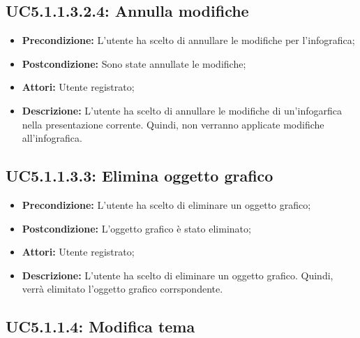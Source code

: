 \subsection{ UC5.1.1.3.2.4: Annulla modifiche}

\begin{itemize}
	\item \textbf{Precondizione:} L'utente ha scelto di annullare le modifiche per l'infografica;
	\item \textbf{Postcondizione:} Sono state annullate le modifiche;
	\item \textbf{Attori:} Utente registrato;
	\item \textbf{Descrizione:} L'utente ha scelto di annullare le modifiche di un'infogarfica nella presentazione corrente. Quindi, non verranno applicate modifiche all'infografica.
\end{itemize}
\subsection{ UC5.1.1.3.3: Elimina oggetto grafico}

\begin{itemize}
	\item \textbf{Precondizione:} L'utente ha scelto di eliminare un oggetto grafico;
	\item \textbf{Postcondizione:} L'oggetto grafico è stato eliminato;
	\item \textbf{Attori:} Utente registrato;
	\item \textbf{Descrizione:} L'utente ha scelto di eliminare un oggetto grafico. Quindi, verrà elimitato l'oggetto grafico corrspondente.
\end{itemize}
\subsection{ UC5.1.1.4: Modifica tema}

